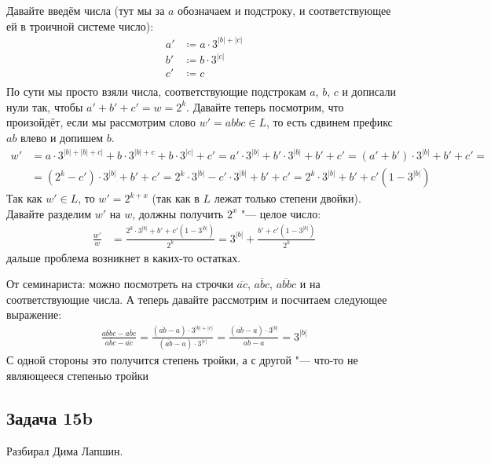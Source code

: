 	Давайте введём числа (тут мы за $a$ обозначаем и подстроку, и соответствующее ей
	в троичной системе число):
	\begin{align*}
		a' &\coloneq a \cdot 3^{|b|+|c|} \\
		b' &\coloneq b \cdot 3^{|c|} \\
		c' &\coloneq c \\
	\end{align*}
	По сути мы просто взяли числа, соответствующие подстрокам $a$, $b$, $c$ и дописали нули так, чтобы
	$a'+b'+c'=w=2^k$.
	Давайте теперь посмотрим, что произойдёт, если мы рассмотрим слово $w'=abbc\in L$,
	то есть сдвинем префикс $ab$ влево и допишем $b$.
	\begin{align*}
		w' &= a\cdot3^{|b|+|b|+c|} + b\cdot3^{|b|+c} + b\cdot3^{|c|} + c' =
		      a'\cdot3^{|b|} + b'\cdot3^{|b|} + b' + c' =
		      (a'+b')\cdot3^{|b|} + b' + c' = \\
		   &= (2^k-c')\cdot3^{|b|} + b' + c' =
		      2^k\cdot3^{|b|}-c'\cdot3^{|b|}+b'+c' =
		      2^k\cdot3^{|b|}+b'+c'(1-3^{|b|})
	\end{align*}
	Так как $w' \in L$, то $w' = 2^{k+x}$ (так как в $L$ лежат только степени двойки).
	Давайте разделим $w'$ на $w$, должны получить $2^x$ "--- целое число:
	\begin{align*}
		\frac{w'}{w}
			&= \frac{2^k\cdot3^{|b|}+b'+c'(1-3^{|b|})}{2^k} =
			3^{|b|}+\frac{b'+c'(1-3^{|b|})}{2^k}
	\end{align*}
	\TODO дальше проблема возникнет в каких-то остатках.

	\begin{Rem}
		От семинариста:
		можно посмотреть на строчки $\overline{ac}$, $\overline{abc}$, $\overline{abbc}$ и на соответствующие числа.
		А теперь давайте рассмотрим и посчитаем следующее выражение:
		\begin{gather*}
			\frac{\overline{abbc}-\overline{abc}}{\overline{abc}-\overline{ac}} =
			\frac{(\overline{ab}-a)\cdot3^{|b|+|c|}}{(\overline{ab}-a)\cdot3^{|c|}} =
			\frac{(\overline{ab}-a)\cdot3^{|b|}}{\overline{ab}-a} =
			3^{|b|}
		\end{gather*}
		С одной стороны это получится степень тройки, а с другой "--- что-то не являющееся степенью тройки
		\TODO
	\end{Rem}

\subsection{Задача 15b}
	Разбирал Дима Лапшин.

